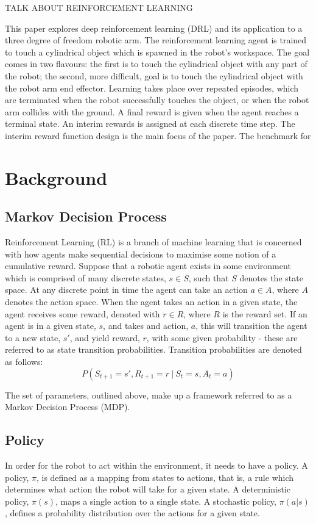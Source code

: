 \documentclass[a4paper]{article}
\begin{document}
TALK ABOUT REINFORCEMENT LEARNING

This paper explores deep reinforcement learning (DRL) and its application to a three degree of freedom robotic arm. The reinforcement learning agent is trained to touch a cylindrical object which is spawned in the robot's workspace. The goal comes in two flavours: the first is to touch the cylindrical object with any part of the robot; the second, more difficult, goal is to touch the cylindrical object with the robot arm end effector. Learning takes place over repeated episodes, which are terminated when the robot successfully touches the object, or when the robot arm collides with the ground. A final reward is given when the agent reaches a terminal state. An interim rewards is assigned at each discrete time step. The interim reward function design is the main focus of the paper. The benchmark for 


\section{Background}
\subsection{Markov Decision Process}
Reinforcement Learning (RL) is a branch of machine learning that is concerned with how agents make sequential decisions to maximise some notion of a cumulative reward. Suppose that a robotic agent exists in some environment which is comprised of many discrete states, $s \in S$, such that $S$ denotes the state space. At any discrete point in time the agent can take an action $a \in A$, where $A$ denotes the action space. When the agent takes an action in a given state, the agent receives some reward, denoted with $r \in R$, where $R$ is the reward set. If an agent is in a given state, $s$, and takes and action, $a$, this will transition the agent to a new state, $s'$, and yield reward, $r$, with some given probability - these are referred to as state transition probabilities. Transition probabilities are denoted as follows:
\begin{equation}
P(S_{t+1}=s', R_{t+1}=r \ | \ S_t = s, A_t = a)
\end{equation}

The set of parameters, outlined above, make up a framework referred to as a Markov Decision Process (MDP).

\subsection{Policy}
In order for the robot to act within the environment, it needs to have a policy. A policy, $\pi$, is defined as a mapping from states to actions, that is, a rule which determines what action the robot will take for a given state. A deterministic policy, $\pi (s)$, maps a single action to a single state. A stochastic policy, $\pi (a | s)$, defines a probability distribution over the actions for a given state.
\end{document}
